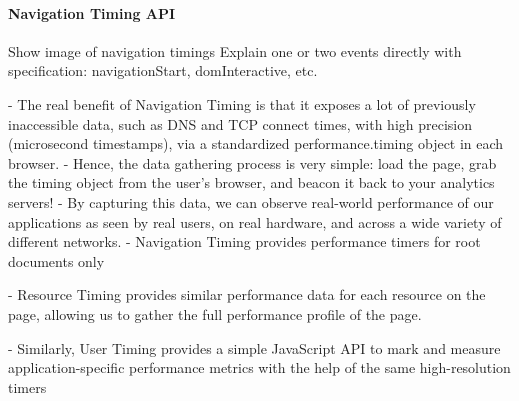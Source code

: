 \paragraph{Navigation Timing API}
 Show image of navigation timings
 Explain one or two events directly with specification: navigationStart, domInteractive, etc.









- The real benefit of Navigation Timing is that it exposes a lot of previously inaccessible data, such as DNS and TCP connect times, with high precision (microsecond timestamps), via a standardized performance.timing object in each browser.
- Hence, the data gathering process is very simple: load the page, grab the timing object from the user’s browser, and beacon it back to your analytics servers!
- By capturing this data, we can observe real-world performance of our applications as seen by real users, on real hardware, and across a wide variety of different networks.
- Navigation Timing provides performance timers for root documents only









- Resource Timing provides similar performance data for each resource on the page, allowing us to gather the full performance profile of the page.





- Similarly, User Timing provides a simple JavaScript API to mark and measure application-specific performance metrics with the help of the same high-resolution timers











